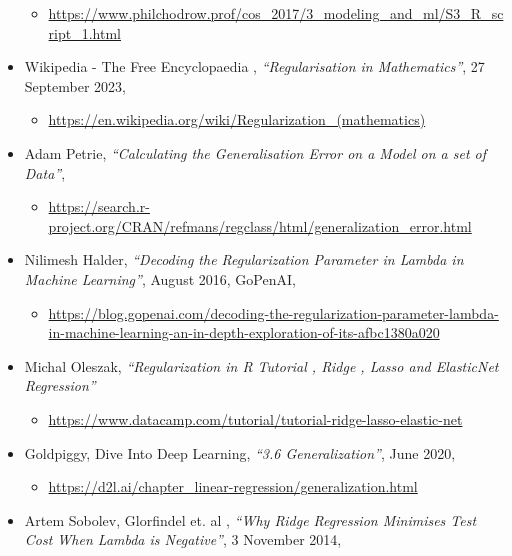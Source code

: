 \documentclass[
]{article}
\providecommand{\tightlist}{%
  \setlength{\itemsep}{0pt}\setlength{\parskip}{0pt}}
\begin{document}
\begin{itemize}
  \begin{itemize}
  \tightlist
  \item
    \url{https://www.philchodrow.prof/cos_2017/3_modeling_and_ml/S3_R_script_1.html}
  \end{itemize}
\item
  Wikipedia - The Free Encyclopaedia , \emph{``Regularisation in
  Mathematics''}, 27 September 2023,

  \begin{itemize}
  \tightlist
  \item
    \url{https://en.wikipedia.org/wiki/Regularization_(mathematics)}
  \end{itemize}
\item
  Adam Petrie, \emph{``Calculating the Generalisation Error on a Model
  on a set of Data''},

  \begin{itemize}
  \tightlist
  \item
    \url{https://search.r-project.org/CRAN/refmans/regclass/html/generalization_error.html}
  \end{itemize}
\item
  Nilimesh Halder, \emph{``Decoding the Regularization Parameter in
  Lambda in Machine Learning''}, August 2016, GoPenAI,

  \begin{itemize}
  \tightlist
  \item
    \url{https://blog.gopenai.com/decoding-the-regularization-parameter-lambda-in-machine-learning-an-in-depth-exploration-of-its-afbc1380a020}
  \end{itemize}
\item
  Michal Oleszak, \emph{``Regularization in R Tutorial , Ridge , Lasso
  and ElasticNet Regression'' }

  \begin{itemize}
  \tightlist
  \item
    \url{https://www.datacamp.com/tutorial/tutorial-ridge-lasso-elastic-net}
  \end{itemize}
\item
  Goldpiggy, Dive Into Deep Learning, \emph{``3.6 Generalization''},
  June 2020,

  \begin{itemize}
  \tightlist
  \item
    \url{https://d2l.ai/chapter_linear-regression/generalization.html}
  \end{itemize}
\item
  Artem Sobolev, Glorfindel et. al , \emph{``Why Ridge Regression
  Minimises Test Cost When Lambda is Negative''}, 3 November 2014,


\end{itemize}
\end{document}
